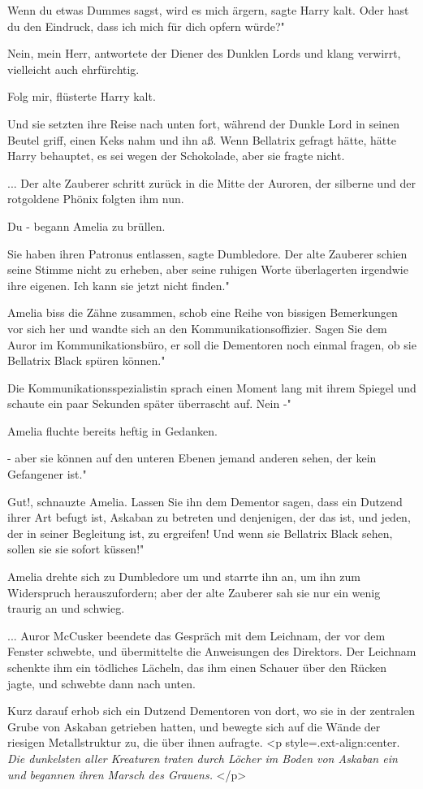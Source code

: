 \glqq{}Wenn du etwas Dummes sagst, wird es mich ärgern\grqq{}, sagte Harry kalt.
\glqq{}Oder hast du den Eindruck, dass ich mich für dich opfern würde?"

\glqq{}Nein, mein Herr\grqq{}, antwortete der Diener des Dunklen Lords und klang
verwirrt, vielleicht auch ehrfürchtig.

\glqq{}Folg mir\grqq{}, flüsterte Harry kalt.

Und sie setzten ihre Reise nach unten fort, während der Dunkle Lord in seinen
Beutel griff, einen Keks nahm und ihn aß. Wenn Bellatrix gefragt hätte, hätte
Harry behauptet, es sei wegen der Schokolade, aber sie fragte nicht.

... Der alte Zauberer schritt zurück in die Mitte der Auroren, der silberne und
der rotgoldene Phönix folgten ihm nun.

\glqq{}Du -\grqq{} begann Amelia zu brüllen.

\glqq{}Sie haben ihren Patronus entlassen\grqq{}, sagte Dumbledore. Der alte
Zauberer schien seine Stimme nicht zu erheben, aber seine ruhigen Worte
überlagerten irgendwie ihre eigenen. \glqq{}Ich kann sie jetzt nicht finden."

Amelia biss die Zähne zusammen, schob eine Reihe von bissigen Bemerkungen vor
sich her und wandte sich an den Kommunikationsoffizier. \glqq{}Sagen Sie dem
Auror im Kommunikationsbüro, er soll die Dementoren noch einmal fragen, ob sie
Bellatrix Black spüren können."

Die Kommunikationsspezialistin sprach einen Moment lang mit ihrem Spiegel und
schaute ein paar Sekunden später überrascht auf. \glqq{}Nein -"

Amelia fluchte bereits heftig in Gedanken.

\glqq{}- aber sie können auf den unteren Ebenen jemand anderen sehen, der kein
Gefangener ist."

\glqq{}Gut!\grqq{}, schnauzte Amelia. \glqq{}Lassen Sie ihn dem Dementor sagen,
dass ein Dutzend ihrer Art befugt ist, Askaban zu betreten und denjenigen, der
das ist, und jeden, der in seiner Begleitung ist, zu ergreifen! Und wenn sie
Bellatrix Black sehen, sollen sie sie sofort küssen!"

Amelia drehte sich zu Dumbledore um und starrte ihn an, um ihn zum Widerspruch
herauszufordern; aber der alte Zauberer sah sie nur ein wenig traurig an und
schwieg.

... Auror McCusker beendete das Gespräch mit dem Leichnam, der vor dem Fenster
schwebte, und übermittelte die Anweisungen des Direktors. Der Leichnam schenkte
ihm ein tödliches Lächeln, das ihm einen Schauer über den Rücken jagte, und
schwebte dann nach unten.

Kurz darauf erhob sich ein Dutzend Dementoren von dort, wo sie in der zentralen
Grube von Askaban getrieben hatten, und bewegte sich auf die Wände der riesigen
Metallstruktur zu, die über ihnen aufragte. <p
style=\grqq{}.ext-align:center\grqq{}. \emph{ Die dunkelsten aller Kreaturen
traten durch Löcher im Boden von Askaban ein und begannen ihren Marsch des
Grauens.} </p>

